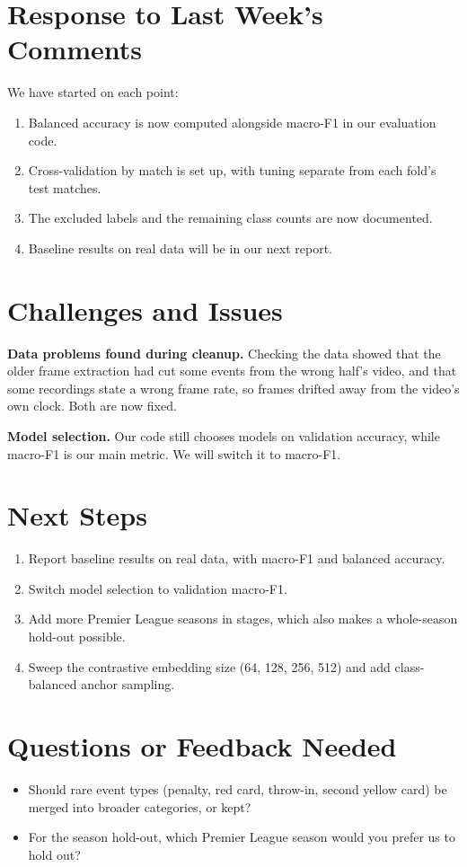 \documentclass[11pt]{article}
\begin{document}
\section*{Response to Last Week's Comments}
We have started on each point:
\begin{enumerate}[noitemsep]
  \item Balanced accuracy is now computed alongside macro-F1 in our evaluation code.
  \item Cross-validation by match is set up, with tuning separate from each fold's test matches.
  \item The excluded labels and the remaining class counts are now documented.
  \item Baseline results on real data will be in our next report.
\end{enumerate}

\section*{Challenges and Issues}
\textbf{Data problems found during cleanup.} Checking the data showed that the older frame extraction
had cut some events from the wrong half's video, and that some recordings state a wrong frame rate, so
frames drifted away from the video's own clock. Both are now fixed.

\textbf{Model selection.} Our code still chooses models on validation accuracy, while macro-F1 is our main
metric. We will switch it to macro-F1.

\section*{Next Steps}
\begin{enumerate}[noitemsep]
  \item Report baseline results on real data, with macro-F1 and balanced accuracy.
  \item Switch model selection to validation macro-F1.
  \item Add more Premier League seasons in stages, which also makes a whole-season hold-out possible.
  \item Sweep the contrastive embedding size (64, 128, 256, 512) and add class-balanced anchor sampling.
\end{enumerate}

\section*{Questions or Feedback Needed}
\begin{itemize}[noitemsep]
  \item Should rare event types (penalty, red card, throw-in, second yellow card) be merged into broader
        categories, or kept?
  \item For the season hold-out, which Premier League season would you prefer us to hold out?
\end{itemize}
\end{document}
